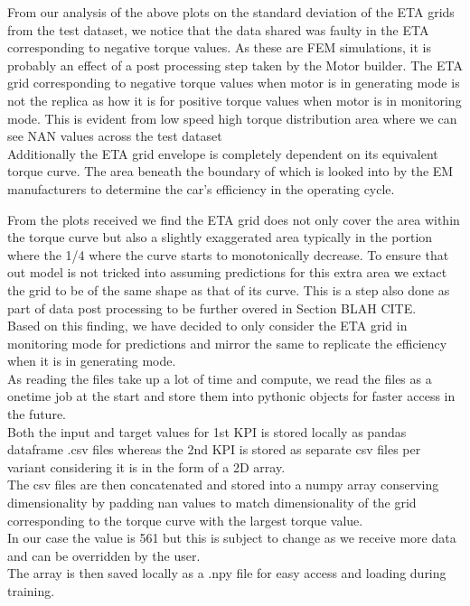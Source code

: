 \documentclass{report} %
\begin{document}
From our analysis of the above plots on the standard deviation of the ETA grids from the test dataset, we notice that the data shared was faulty in the ETA corresponding to negative torque values.
As these are FEM simulations, it is probably an effect of a post processing step taken by the Motor builder.
The ETA grid corresponding to negative torque values when motor is in generating mode is not the replica as how it is for positive torque values when motor is in monitoring mode. 
This is evident from low speed high torque distribution area where we can see NAN values across the test dataset\\

Additionally the ETA grid envelope is completely dependent on its equivalent torque curve. The area beneath the boundary of which is looked into by the \ac{EM} manufacturers to determine the car's efficiency in the operating cycle.

From the plots received we find the ETA grid does not only cover the area within the torque curve but also a slightly exaggerated area typically in the portion where the 1/4 where the curve starts to monotonically decrease.
To ensure that out model is not tricked into assuming predictions for this extra area we extact the grid to be of the same shape as that of its curve.
This is a step also done as part of data post processing to be further overed in Section BLAH CITE. \\

Based on this finding, we have decided to only consider the ETA grid in monitoring mode for predictions and mirror the same to replicate the efficiency when it is in generating mode.\\

As reading the files take up a lot of time and compute, we read the files as a onetime job at the start and store them into pythonic objects for faster access in the future.\\
Both the input and target values for 1st \ac{KPI} is stored locally as pandas dataframe .csv files whereas the 2nd \ac{KPI} is stored as separate csv files per variant considering it is in the form of a \ac{2D} array.\\
The csv files are then concatenated and stored into a numpy array conserving dimensionality by padding nan values to match dimensionality of the grid corresponding to the torque curve with the largest torque value.\\
In our case the value is 561 but this is subject to change as we receive more data and can be overridden by the user.\\
The array is then saved locally as a .npy file for easy access and loading during training.\\
\end{document}
